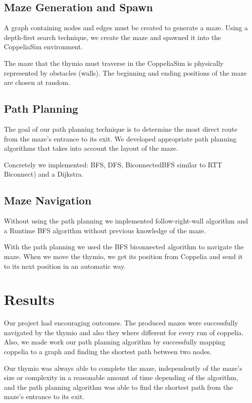 \documentclass[12pt, a4paper, twocolumn]{article}
\begin{document}
\subsection{Maze Generation and Spawn}

A graph containing nodes and edges must be created to generate a maze. Using a depth-first search technique, we create the maze and spawned it into the CoppeliaSim environment.

The maze that the thymio must traverse in the CoppeliaSim is physically represented by obstacles (walls). The beginning and ending positions of the maze are chosen at random.

\subsection{Path Planning}

The goal of our path planning technique is to determine the most direct route from the maze's entrance to its exit. We developed appropriate path planning algorithms that takes into account the layout of the maze.

Concretely we implemented: BFS, DFS, BiconnectedBFS similar to RTT Biconnect) and a Dijkstra.

\subsection{Maze Navigation}

Without using the path planning we implemented follow-right-wall algorithm and a Runtime BFS algorithm without previous knowledge of the maze.

With the path planning we used the BFS biconnected algorithm to navigate the maze. When we move the thymio, we get its position from Coppelia and send it to its next position in an automatic way.

\section{Results}

Our project had encouraging outcomes. The produced mazes were successfully navigated by the thymio and also they where different for every run of coppelia. Also, we made work our path planning algorithm by successfully mapping coppelia to a graph and finding the shortest path between two nodes.

Our thymio was always able to complete the maze, independently of the maze's size or complexity in a reasonable amount of time depending of the algorithm, and the path planning algorithm was able to find the shortest path from the maze's entrance to its exit.
\end{document}
